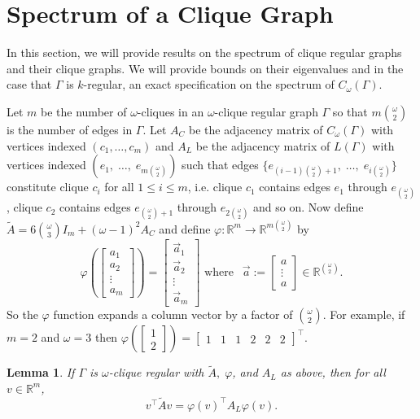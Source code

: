\documentclass[12pt]{report}
\newtheorem{lem}[thm]{Lemma}
\theoremstyle{definition}
\begin{document}
\section{Spectrum of a Clique Graph}
In this section, we will provide results on the spectrum of clique regular graphs and their clique graphs. We will provide bounds on their eigenvalues and in the case that $\Gamma$ is $k$-regular, an exact specification on the spectrum of $C_\omega(\Gamma)$.\par
Let $m$ be the number of $\omega$-cliques in an $\omega$-clique regular graph $\Gamma$ so that $m\binom{\omega}{2}$ is the number of edges in $\Gamma$. Let $A_C$ be the adjacency matrix of $C_\omega(\Gamma)$ with vertices indexed $(c_1, \ldots , c_{m})$ and $A_L$ be the adjacency matrix of $L(\Gamma)$ with vertices indexed $(e_1, \; \ldots, \;e_{m\binom{\omega}{2}})$ such that edges $\{e_{(i-1)\binom{\omega}{2} +1},\; \ldots, \; e_{i\binom{\omega}{2}}\}$ constitute clique $c_i$ for all $1 \leq i \leq m$, i.e. clique $c_1$ contains edges $e_1$ through $e_{\binom{\omega}{2}}$, clique $c_2$ contains edges $e_{\binom{\omega}{2}+1}$ through $e_{2\binom{\omega}{2}}$ and so on.
Now define $\tilde{A} = 6\binom{\omega}{3}I_{m} + (\omega -1)^2A_C$ and
define $\varphi : \mathbb{R}^{m} \rightarrow \mathbb{R}^{m\binom{\omega}{2}}$ by 
\[\varphi\left(\begin{bmatrix}a_1\\a_2\\\vdots\\a_{m}
\end{bmatrix}\right)=\begin{bmatrix}\Vec{a}_1\\\Vec{a}_2\\\vdots\\\Vec{a}_{m}\end{bmatrix} \text{ where } \:\ \Vec{a}:=
    \begin{bmatrix}a\\\vdots\\a\end{bmatrix} \in \mathbb{R}^{\binom{\omega}{2}}.\]
So the $\varphi$ function expands a column vector by a factor of $\binom{\omega}{2}$. For example, if $m=2$ and $\omega = 3$ then $\varphi\left(\begin{bmatrix}1\\2\end{bmatrix}\right)=\begin{bmatrix}1 &1&1&2&2&2\end{bmatrix}^\top$.
\begin{lem} \label{lem:phi}
If $\Gamma$ is $\omega$-clique regular with $\tilde{A},\; \varphi$, and $A_L$ as above, then for all $v \in \mathbb{R}^{m}$, \[v^\top \tilde{A}v = \varphi(v)^\top A_L \varphi(v).\]
\end{lem}
\end{document}
